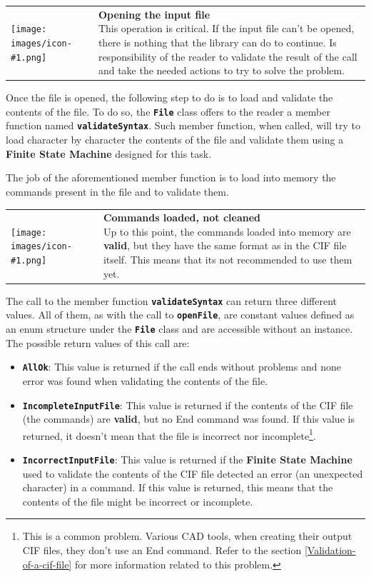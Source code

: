 \documentclass[11pt,twoside,openany,x11names,svgnames]{memoir}
\makeatletter
\newcommand{\IconNote}[3]
{
	\begin{table}[ht]
	\begin{tabular}{ lm{\dimexpr\textwidth-8\tabcolsep-\wd0}@{}}
		\toprule
		\texttt{[image: images/icon-\#1.png]}
		&
		\parbox[t]{155mm}{
		\textbf{#2} \\
		#3
		}
	\end{tabular}
\end{table}
}
\makeatother
\begin{document}
\IconNote
	{error}
	{Opening the input file}
	{This operation is critical. If the input file can't be opened, there is nothing that the library can do to continue. Is responsibility of the reader to validate the result of the call and take the needed actions to try to solve the problem.}
	
Once the file is opened, the following step to do is to load and validate the contents of the file. To do so, the \textbf{\texttt{File}} class offers to the reader a member function named \textbf{\texttt{validateSyntax}}. Such member function, when called, will try to load character by character the contents of the file and validate them using a \textbf{Finite State Machine} designed for this task.

The job of the aforementioned member function is to load into memory the commands present in the file and to validate them. 

\IconNote
	{warning}
	{Commands loaded, not cleaned}
	{Up to this point, the commands loaded into memory are \textbf{valid}, but they have the same format as in the CIF file itself. This means that its not recommended to use them yet.}
	
The call to the member function \textbf{\texttt{validateSyntax}} can return three different values. All of them, as with the call to \textbf{\texttt{openFile}}, are constant values defined as an enum structure under the \textbf{\texttt{File}} class and are accessible without an instance. The possible return values of this call are:

\begin{itemize}
	\item \textbf{\texttt{AllOk}}: This value is returned if the call ends without problems and none error was found when validating the contents of the file.
	
	\item \textbf{\texttt{IncompleteInputFile}}: This value is returned if the contents of the CIF file (the commands) are \textbf{valid}, but no End command was found. If this value is returned, it doesn't mean that the file is incorrect nor incomplete\footnote{This is a common problem. Various CAD tools, when creating their output CIF files, they don't use an End command. Refer to the section \ref{Validation-of-a-cif-file} for more information related to this problem.}.
	
	\item \textbf{\texttt{IncorrectInputFile}}: This value is returned if the \textbf{Finite State Machine} used to validate the contents of the CIF file detected an error (an unexpected character) in a command. If this value is returned, this means that the contents of the file might be incorrect or incomplete.
\end{itemize}
\end{document}
